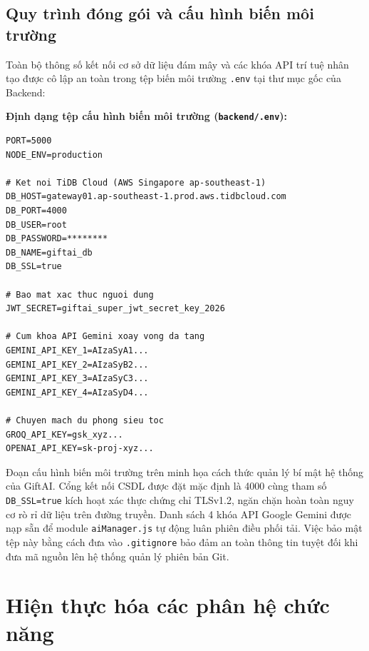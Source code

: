 \subsection{Quy trình đóng gói và cấu hình biến môi trường}
Toàn bộ thông số kết nối cơ sở dữ liệu đám mây và các khóa API trí tuệ nhân tạo được cô lập an toàn trong tệp biến môi trường \texttt{.env} tại thư mục gốc của Backend:

\begin{infobox}
\textbf{Định dạng tệp cấu hình biến môi trường (\texttt{backend/.env}):}
\footnotesize
\begin{verbatim}
PORT=5000
NODE_ENV=production

# Ket noi TiDB Cloud (AWS Singapore ap-southeast-1)
DB_HOST=gateway01.ap-southeast-1.prod.aws.tidbcloud.com
DB_PORT=4000
DB_USER=root
DB_PASSWORD=********
DB_NAME=giftai_db
DB_SSL=true

# Bao mat xac thuc nguoi dung
JWT_SECRET=giftai_super_jwt_secret_key_2026

# Cum khoa API Gemini xoay vong da tang
GEMINI_API_KEY_1=AIzaSyA1...
GEMINI_API_KEY_2=AIzaSyB2...
GEMINI_API_KEY_3=AIzaSyC3...
GEMINI_API_KEY_4=AIzaSyD4...

# Chuyen mach du phong sieu toc
GROQ_API_KEY=gsk_xyz...
OPENAI_API_KEY=sk-proj-xyz...
\end{verbatim}
\end{infobox}

Đoạn cấu hình biến môi trường trên minh họa cách thức quản lý bí mật hệ thống của GiftAI. Cổng kết nối CSDL được đặt mặc định là 4000 cùng tham số \texttt{DB\_SSL=true} kích hoạt xác thực chứng chỉ TLSv1.2, ngăn chặn hoàn toàn nguy cơ rò rỉ dữ liệu trên đường truyền. Danh sách 4 khóa API Google Gemini được nạp sẵn để module \texttt{aiManager.js} tự động luân phiên điều phối tải. Việc bảo mật tệp này bằng cách đưa vào \texttt{.gitignore} bảo đảm an toàn thông tin tuyệt đối khi đưa mã nguồn lên hệ thống quản lý phiên bản Git.

\section{Hiện thực hóa các phân hệ chức năng}

